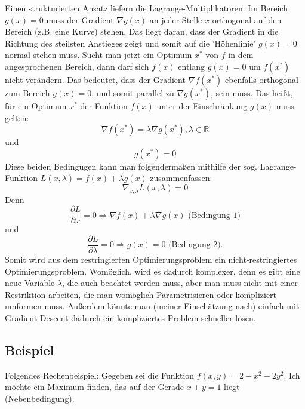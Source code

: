 \documentclass{article}
\begin{document}
Einen strukturierten Ansatz liefern die Lagrange-Multiplikatoren: Im Bereich \(g(x)=0\) muss der Gradient \(\nabla g(x)\) an jeder Stelle \(x\) orthogonal auf den Bereich (z.B. eine Kurve) stehen. Das liegt daran, dass der Gradient in die Richtung des steilsten Anstieges zeigt und somit auf die 'Höhenlinie' \(g(x)=0\) normal stehen muss. Sucht man jetzt ein Optimum \(x^*\) von \(f\) in dem angesprochenen Bereich, dann darf sich \(f(x)\) entlang \(g(x)=0\) um \(f(x^*)\) nicht verändern. Das bedeutet, dass der Gradient \(\nabla f(x^*)\) ebenfalls orthogonal zum Bereich \(g(x)=0\), und somit parallel zu \(\nabla g(x^*)\), sein muss. Das heißt, für ein Optimum \(x^*\) der Funktion \(f(x)\) unter der Einschränkung \(g(x)\) muss gelten:\[
    \nabla f(x^*)=\lambda \nabla g(x^*), \lambda\in\mathbb R
\]und\[
g(x^*)=0
\]Diese beiden Bedingugen kann man folgendermaßen mithilfe der sog. Lagrange-Funktion \(L(x,\lambda)=f(x)+\lambda g(x)\) zusammenfassen:\[
\nabla_{x,\lambda}L(x,\lambda)=0
\]Denn\[
\frac{\partial L}{\partial x}=0\Longrightarrow\nabla f(x)+\lambda\nabla g(x)\text{ (Bedingung 1)}
\]und\[
\frac{\partial L}{\partial \lambda}=0\Longrightarrow g(x)=0\text{ (Bedingung 2)}.
\]Somit wird aus dem restringierten Optimierungsproblem ein nicht-restringiertes Optimierungsproblem. Womöglich, wird es dadurch komplexer, denn es gibt eine neue Variable \(\lambda\), die auch beachtet werden muss, aber man muss nicht mit einer Restriktion arbeiten, die man womöglich Parametrisieren oder kompliziert umformen muss. Außerdem könnte man (meiner Einschätzung nach) einfach mit Gradient-Descent dadurch ein kompliziertes Problem schneller lösen.

\subsection{Beispiel}
Folgendes Rechenbeispiel: Gegeben sei die Funktion \(f(x,y)=2-x^2-2y^2\). Ich möchte ein Maximum finden, das auf der Gerade \(x+y=1\) liegt (Nebenbedingung).
\end{document}
